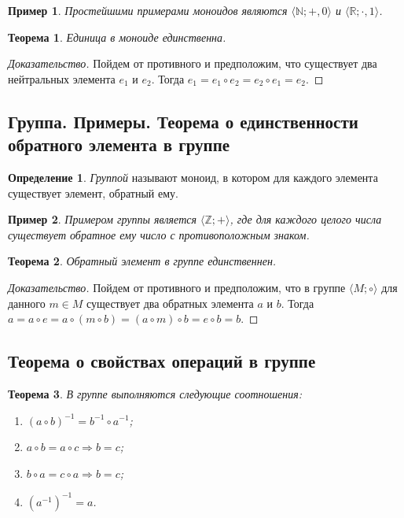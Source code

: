 \documentclass{article}
\newtheorem*{theorem*}{Теорема}
\theoremstyle{plain}
\newtheorem*{example*}{Пример}
\theoremstyle{definition}
\newtheorem{definition}{Определение}[subsection]
\begin{document}
\begin{example*}
	Простейшими примерами моноидов являются \(\langle \mathbb{N}; +, 0\rangle\) и \(\langle \mathbb{R}; \cdot, 1 \rangle\).
\end{example*}

\begin{theorem*}
	Единица в моноиде единственна.
\end{theorem*}

\begin{proof}[Доказательство]
	Пойдем от противного и предположим, что существует два нейтральных элемента \(e_1\) и \(e_2\). Тогда \(e_1 = e_1 \circ e_2 = e_2 \circ e_1 = e_2\).
\end{proof}

\subsection{Группа. Примеры. Теорема о единственности обратного элемента в группе}

\begin{definition}
	\textit{Группой} называют моноид, в котором для каждого элемента существует элемент, обратный ему.
\end{definition}

\begin{example*}
	Примером группы является \(\langle \mathbb{Z}; + \rangle\), где для каждого целого числа существует обратное ему число с противоположным знаком.
\end{example*}

\begin{theorem*}
	Обратный элемент в группе единственнен.
\end{theorem*}

\begin{proof}[Доказательство]
	Пойдем от противного и предположим, что в группе \(\langle M; \circ \rangle\) для данного \(m \in M\) существует два обратных элемента \(a\) и \(b\). Тогда \(a = a \circ e = a \circ (m \circ b) = (a \circ m) \circ b = e \circ b = b\).
\end{proof}

\subsection{Теорема о свойствах операций в группе}

\begin{theorem*}
	В группе выполняются следующие соотношения:

	\begin{enumerate}
		\item \((a \circ b)^{-1} = b^{-1} \circ a^{-1}\);
		\item \(a \circ b = a \circ c \Rightarrow b = c\);
		\item \(b \circ a = c \circ a \Rightarrow b = c\);
		\item \((a^{-1})^{-1} = a\).  
	\end{enumerate}
\end{theorem*}
\end{document}
